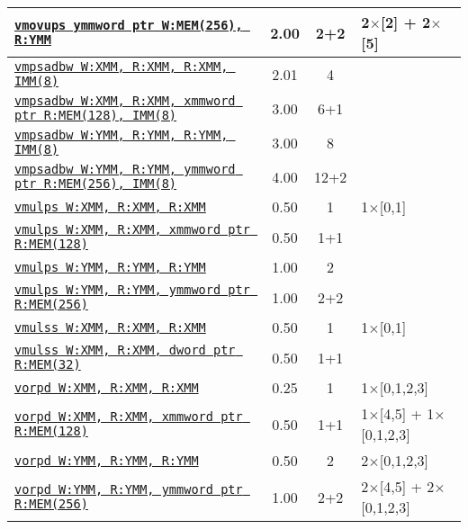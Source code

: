 \documentclass[a4paper,english,fontsize=9]{scrartcl}
\begin{document}
\begin{longtable}{p{}ccL{.25\textwidth}}
  \midrule
  \texttt{\href{https://felixcloutier.com/x86/MOVUPS.html}{vmovups ymmword ptr W:MEM(256), R:YMM}} & 2.00 & 2+2 & 2\(\times\)[2] + 2\(\times\)[5] \\
  \midrule
  \texttt{\href{https://felixcloutier.com/x86/MPSADBW.html}{vmpsadbw W:XMM, R:XMM, R:XMM, IMM(8)}} & 2.01 & 4 &  \\
  \midrule
  \texttt{\href{https://felixcloutier.com/x86/MPSADBW.html}{vmpsadbw W:XMM, R:XMM, xmmword ptr R:MEM(128), IMM(8)}} & 3.00 & 6+1 &  \\
  \midrule
  \texttt{\href{https://felixcloutier.com/x86/MPSADBW.html}{vmpsadbw W:YMM, R:YMM, R:YMM, IMM(8)}} & 3.00 & 8 &  \\
  \midrule
  \texttt{\href{https://felixcloutier.com/x86/MPSADBW.html}{vmpsadbw W:YMM, R:YMM, ymmword ptr R:MEM(256), IMM(8)}} & 4.00 & 12+2 &  \\
  \midrule
  \texttt{\href{https://felixcloutier.com/x86/MULPS.html}{vmulps W:XMM, R:XMM, R:XMM}} & 0.50 & 1 & 1\(\times\)[0,1] \\
  \midrule
  \texttt{\href{https://felixcloutier.com/x86/MULPS.html}{vmulps W:XMM, R:XMM, xmmword ptr R:MEM(128)}} & 0.50 & 1+1 &  \\
  \midrule
  \texttt{\href{https://felixcloutier.com/x86/MULPS.html}{vmulps W:YMM, R:YMM, R:YMM}} & 1.00 & 2 &  \\
  \midrule
  \texttt{\href{https://felixcloutier.com/x86/MULPS.html}{vmulps W:YMM, R:YMM, ymmword ptr R:MEM(256)}} & 1.00 & 2+2 &  \\
  \midrule
  \texttt{\href{https://felixcloutier.com/x86/MULSS.html}{vmulss W:XMM, R:XMM, R:XMM}} & 0.50 & 1 & 1\(\times\)[0,1] \\
  \midrule
  \texttt{\href{https://felixcloutier.com/x86/MULSS.html}{vmulss W:XMM, R:XMM, dword ptr R:MEM(32)}} & 0.50 & 1+1 &  \\
  \midrule
  \texttt{\href{https://felixcloutier.com/x86/ORPD.html}{vorpd W:XMM, R:XMM, R:XMM}} & 0.25 & 1 & 1\(\times\)[0,1,2,3] \\
  \midrule
  \texttt{\href{https://felixcloutier.com/x86/ORPD.html}{vorpd W:XMM, R:XMM, xmmword ptr R:MEM(128)}} & 0.50 & 1+1 & 1\(\times\)[4,5] + 1\(\times\)[0,1,2,3] \\
  \midrule
  \texttt{\href{https://felixcloutier.com/x86/ORPD.html}{vorpd W:YMM, R:YMM, R:YMM}} & 0.50 & 2 & 2\(\times\)[0,1,2,3] \\
  \midrule
  \texttt{\href{https://felixcloutier.com/x86/ORPD.html}{vorpd W:YMM, R:YMM, ymmword ptr R:MEM(256)}} & 1.00 & 2+2 & 2\(\times\)[4,5] + 2\(\times\)[0,1,2,3] \\

\end{longtable}
\end{document}
